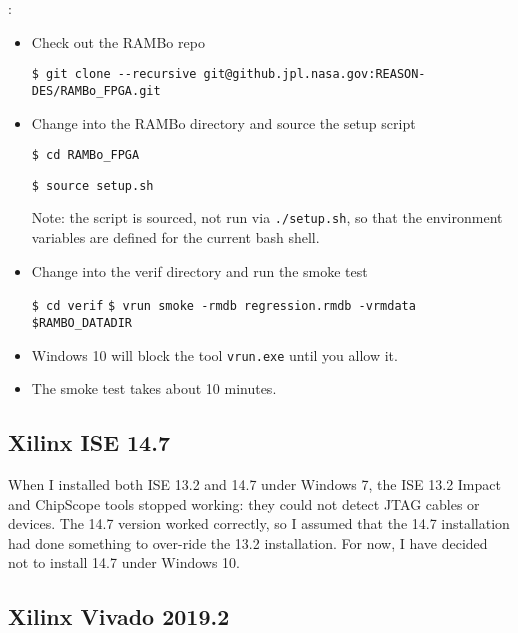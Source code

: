 \documentclass[10pt,twoside]{article}
\begin{document}
\vskip10mm
:
\begin{itemize}
\item Check out the RAMBo repo

\verb+$ git clone --recursive git@github.jpl.nasa.gov:REASON-DES/RAMBo_FPGA.git+

\item Change into the RAMBo directory and source the setup script

\verb+$ cd RAMBo_FPGA+

\verb+$ source setup.sh+

Note: the script is sourced, not run via \verb+./setup.sh+, so that the
environment variables are defined for the current bash shell.

\item Change into the verif directory and run the smoke test

\verb+$ cd verif+
\verb+$ vrun smoke -rmdb regression.rmdb -vrmdata $RAMBO_DATADIR+

\item Windows 10 will block the tool \verb+vrun.exe+ until you allow it.

\item The smoke test takes about 10 minutes.

\end{itemize}

\clearpage
\subsection{Xilinx ISE 14.7}

When I installed both ISE 13.2 and 14.7 under Windows 7, the ISE 13.2 Impact
and ChipScope tools stopped working: they could not detect JTAG cables or
devices. The 14.7 version worked correctly, so I assumed that the 14.7
installation had done something to over-ride the 13.2 installation.
For now, I have decided not to install 14.7 under Windows 10.

\subsection{Xilinx Vivado 2019.2}
\end{document}
